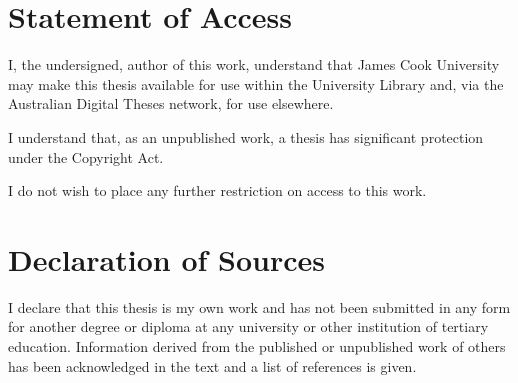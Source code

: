 
\chapter*{Statement of Access}

%

%
I, the undersigned, author of this work, understand that James Cook
University may make this thesis available for use within the University
Library and, via the Australian Digital Theses network, for use elsewhere.

I understand that, as an unpublished work, a thesis has significant
protection under the Copyright Act.

I do not wish to place any further restriction on access to this work.

\bigskip{}


\bigskip{}


\bigskip{}


\bigskip{}


\par\noindent\makebox[2.5in]{\hrulefill} \hfill\makebox[2.0in]{\hrulefill}%
\par\noindent{}      \hfill{}%


\chapter*{Declaration of Sources}

%

%
I declare that this thesis is my own work and has not been submitted
in any form for another degree or diploma at any university or other
institution of tertiary education. Information derived from the published
or unpublished work of others has been acknowledged in the text and
a list of references is given. 

\bigskip{}


\bigskip{}


\bigskip{}


\bigskip{}


\par\noindent\makebox[2.5in]{\hrulefill} \hfill\makebox[2.0in]{\hrulefill}%
\par\noindent{}      \hfill{}%
